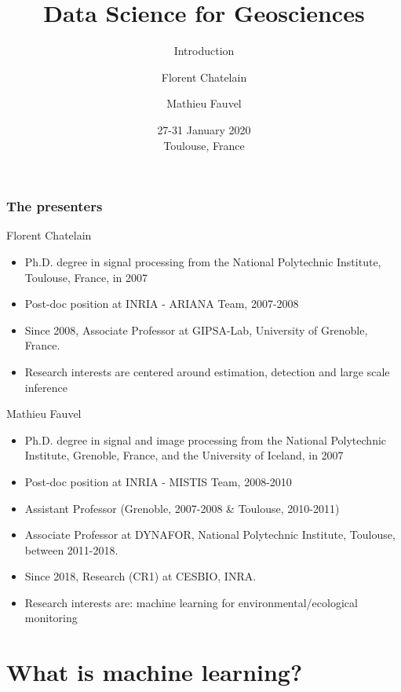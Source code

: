 \documentclass[pressentation,9pt,aspectratio=1610,xcolor=table]{beamer}
\title{Data Science for Geosciences}
\subtitle{Introduction}
\author{Florent Chatelain \inst{1} \and Mathieu Fauvel \inst{2}}
\institute{
  \inst{1} MCF Grenoble INP, GIPSA-lab \and %
  \inst{2} CR1 INRA, CESBIO
}
\date{27-31 January 2020\\Toulouse, France}
\begin{document}
\maketitle
\pgfplotsset{compat=newest}


\begin{frame}
  \frametitle{The presenters}
  \begin{block}{Florent Chatelain}
    \begin{itemize}
    \item Ph.D. degree in signal processing from the National Polytechnic Institute, Toulouse, France, in 2007
    \item Post-doc position at INRIA - ARIANA Team, 2007-2008
    \item Since 2008, Associate Professor at GIPSA-Lab, University of Grenoble, France.
    \item Research interests are centered around estimation, detection and large scale inference
    \end{itemize}
  \end{block}

  \begin{block}{Mathieu Fauvel}
    \begin{itemize}
    \item Ph.D. degree in signal and image processing from the National Polytechnic Institute, Grenoble, France, and the University of Iceland, in 2007
    \item Post-doc position at INRIA - MISTIS Team, 2008-2010
    \item Assistant Professor (Grenoble, 2007-2008 \& Toulouse, 2010-2011)
    \item Associate Professor at DYNAFOR, National Polytechnic Institute, Toulouse, between 2011-2018.
    \item Since 2018, Research (CR1) at CESBIO, INRA.
    \item Research interests are: machine learning for environmental/ecological monitoring
    \end{itemize}
  \end{block}
\end{frame}

\section{What is machine learning?}
\end{document}
